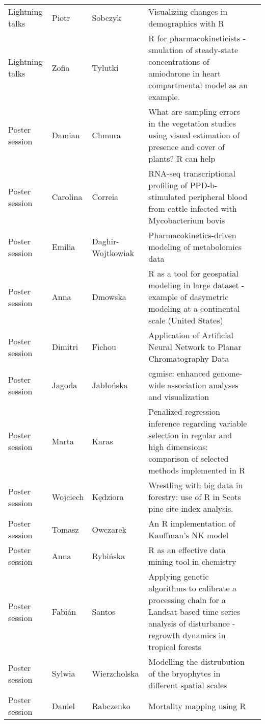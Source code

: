 \begin{longtable}{|p{2.6cm}|p{1.7cm}|p{2.0cm}|p{6.5cm}|p{1.5cm}|}
  Lightning talks & Piotr & Sobczyk & Visualizing changes in demographics with R &  \\ 
  Lightning talks & Zofia & Tylutki & R for pharmacokineticists - smulation of steady-state concentrations of amiodarone in heart compartmental model as an example. &  \\ 
    \hline
  Poster session & Damian & Chmura & What are sampling errors in the vegetation studies using visual estimation of presence and cover of plants? R can help &  \\ 
  Poster session & Carolina & Correia & RNA-seq transcriptional profiling of PPD-b-stimulated peripheral blood from cattle infected with Mycobacterium bovis &  \\ 
  Poster session & Emilia & Daghir-Wojtkowiak & Pharmacokinetics-driven modeling of metabolomics data &  \\ 
  Poster session & Anna & Dmowska & R as a tool for geospatial modeling in large dataset - example of dasymetric modeling at a continental scale (United States) &  \\ 
  Poster session & Dimitri & Fichou & Application of Artificial Neural Network to Planar Chromatography Data &  \\ 
  Poster session & Jagoda & Jabłońska & cgmisc: enhanced genome-wide association analyses and visualization &  \\ 
  Poster session & Marta & Karas & Penalized regression inference regarding variable selection in regular and high dimensions: comparison of selected methods implemented in R &  \\ 
  Poster session & Wojciech & Kędziora & Wrestling with big data in forestry: use of R in Scots pine site index analysis. &  \\ 
  Poster session & Tomasz & Owczarek & An R implementation of Kauffman's NK model &  \\ 
  Poster session & Anna & Rybińska & R as an effective data mining tool in chemistry &  \\ 
  Poster session & Fabián & Santos & Applying genetic algorithms to calibrate a processing chain for a Landsat-based time series analysis of disturbance - regrowth dynamics in tropical forests &  \\ 
  Poster session & Sylwia & Wierzcholska & Modelling the distrubution of the bryophytes in different spatial scales &  \\ 
  Poster session & Daniel & Rabczenko & Mortality mapping using R &  \\ 
   \hline
\end{longtable}
\endgroup
